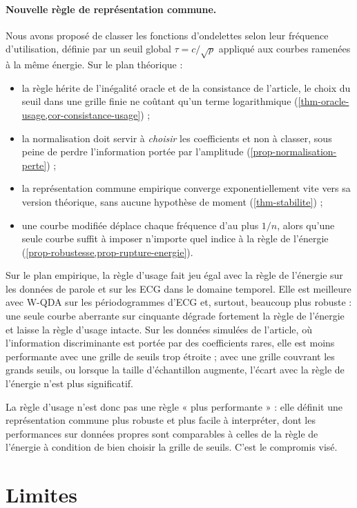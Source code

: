 \paragraph{Nouvelle règle de représentation commune.} Nous avons proposé de classer les fonctions d'ondelettes selon leur fréquence d'utilisation, définie par un seuil global $\tau=c/\sqrt p$ appliqué aux courbes ramenées à la même énergie. Sur le plan théorique :
\begin{itemize}
  \item la règle hérite de l'inégalité oracle et de la consistance de l'article, le choix du seuil dans une grille finie ne coûtant qu'un terme logarithmique (\cref{thm-oracle-usage,cor-consistance-usage}) ;
  \item la normalisation doit servir à \emph{choisir} les coefficients et non à classer, sous peine de perdre l'information portée par l'amplitude (\cref{prop-normalisation-perte}) ;
  \item la représentation commune empirique converge exponentiellement vite vers sa version théorique, sans aucune hypothèse de moment (\cref{thm-stabilite}) ;
  \item une courbe modifiée déplace chaque fréquence d'au plus $1/n$, alors qu'une seule courbe suffit à imposer n'importe quel indice à la règle de l'énergie (\cref{prop-robustesse,prop-rupture-energie}).
\end{itemize}
Sur le plan empirique, la règle d'usage fait jeu égal avec la règle de l'énergie sur les données de parole et sur les ECG dans le domaine temporel. Elle est meilleure avec W-QDA sur les périodogrammes d'ECG et, surtout, beaucoup plus robuste : une seule courbe aberrante sur cinquante dégrade fortement la règle de l'énergie et laisse la règle d'usage intacte. Sur les données simulées de l'article, où l'information discriminante est portée par des coefficients rares, elle est moins performante avec une grille de seuils trop étroite ; avec une grille couvrant les grands seuils, ou lorsque la taille d'échantillon augmente, l'écart avec la règle de l'énergie n'est plus significatif.

La règle d'usage n'est donc pas une règle « plus performante » : elle définit une représentation commune plus robuste et plus facile à interpréter, dont les performances sur données propres sont comparables à celles de la règle de l'énergie à condition de bien choisir la grille de seuils. C'est le compromis visé.

\section{Limites}

